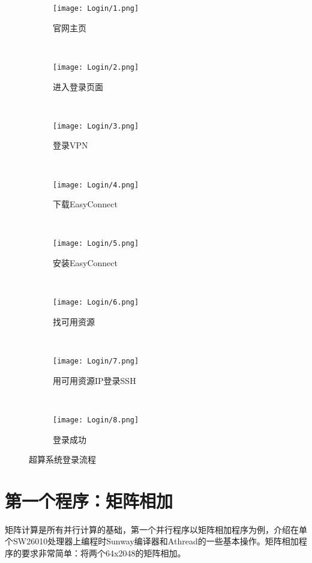 \begin{figure}[!htbp]
	\centering
	\begin{subfigure}[b]{0.49\textwidth}
		\texttt{[image: Login/1.png]}
		\caption{官网主页}
		\label{fig:登录步骤1}
	\end{subfigure}%
	~%
	\begin{subfigure}[b]{0.49\textwidth}
		\texttt{[image: Login/2.png]}
		\caption{进入登录页面}
		\label{fig:登录步骤2}
	\end{subfigure}
	\\%
	\begin{subfigure}[b]{0.49\textwidth}
		\texttt{[image: Login/3.png]}
		\caption{登录VPN}
		\label{fig:登录步骤3}
	\end{subfigure}%
	~%
	\begin{subfigure}[b]{0.49\textwidth}
		\texttt{[image: Login/4.png]}
		\caption{下载EasyConnect}
		\label{fig:登录步骤4}
	\end{subfigure}
	\\%
	\begin{subfigure}[b]{0.49\textwidth}
		\texttt{[image: Login/5.png]}
		\caption{安装EasyConnect}
		\label{fig:登录步骤5}
	\end{subfigure}%
	~%
	\begin{subfigure}[b]{0.49\textwidth}
		\texttt{[image: Login/6.png]}
		\caption{找可用资源}
		\label{fig:登录步骤6}
	\end{subfigure}
	\\%
	\begin{subfigure}[b]{0.49\textwidth}
		\texttt{[image: Login/7.png]}
		\caption{用可用资源IP登录SSH}
		\label{fig:登录步骤7}
	\end{subfigure}%
	~%
	\begin{subfigure}[b]{0.49\textwidth}
		\texttt{[image: Login/8.png]}
		\caption{登录成功}
		\label{fig:登录步骤8}
	\end{subfigure}
	\caption{超算系统登录流程}
	\label{fig:oaspl}
\end{figure}

\section{第一个程序：矩阵相加}
矩阵计算是所有并行计算的基础，第一个并行程序以矩阵相加程序为例，介绍在单个SW26010处理器上编程时Sunway编译器和Athread的一些基本操作。矩阵相加程序的要求非常简单：将两个64x2048的矩阵相加。

